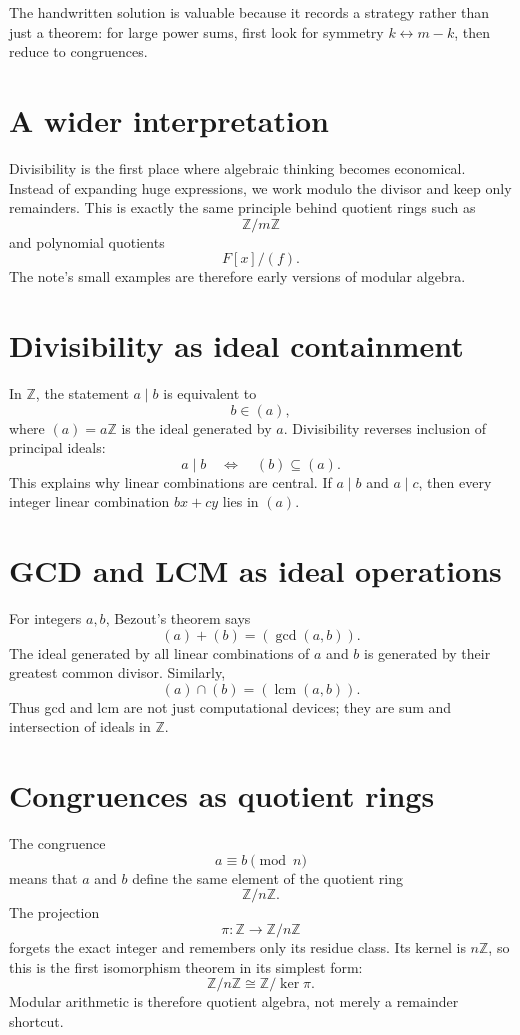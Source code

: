 The handwritten solution is valuable because it records a strategy rather than just a theorem: for large power sums, first look for symmetry \(k\leftrightarrow m-k\), then reduce to congruences.

\section{A wider interpretation}

Divisibility is the first place where algebraic thinking becomes economical.  Instead of expanding huge expressions, we work modulo the divisor and keep only remainders.  This is exactly the same principle behind quotient rings such as
\[
  \mathbb Z/m\mathbb Z
\]
and polynomial quotients
\[
  F[x]/(f).
\]
The note's small examples are therefore early versions of modular algebra.

\section{Divisibility as ideal containment}

In \(\mathbb Z\), the statement \(a\mid b\) is equivalent to
\[
  b\in(a),
\]
where \((a)=a\mathbb Z\) is the ideal generated by \(a\).  Divisibility reverses inclusion of principal ideals:
\[
  a\mid b\quad\Longleftrightarrow\quad (b)\subseteq(a).
\]
This explains why linear combinations are central.  If \(a\mid b\) and \(a\mid c\), then every integer linear combination \(bx+cy\) lies in \((a)\).

\section{GCD and LCM as ideal operations}

For integers \(a,b\), Bezout's theorem says
\[
  (a)+(b)=(\gcd(a,b)).
\]
The ideal generated by all linear combinations of \(a\) and \(b\) is generated by their greatest common divisor.  Similarly,
\[
  (a)\cap(b)=(\operatorname{lcm}(a,b)).
\]
Thus gcd and lcm are not just computational devices; they are sum and intersection of ideals in \(\mathbb Z\).

\section{Congruences as quotient rings}

The congruence
\[
  a\equiv b\pmod n
\]
means that \(a\) and \(b\) define the same element of the quotient ring
\[
  \mathbb Z/n\mathbb Z.
\]
The projection
\[
  \pi:\mathbb Z\to\mathbb Z/n\mathbb Z
\]
forgets the exact integer and remembers only its residue class.  Its kernel is \(n\mathbb Z\), so this is the first isomorphism theorem in its simplest form:
\[
  \mathbb Z/n\mathbb Z\cong \mathbb Z/\ker\pi.
\]
Modular arithmetic is therefore quotient algebra, not merely a remainder shortcut.

